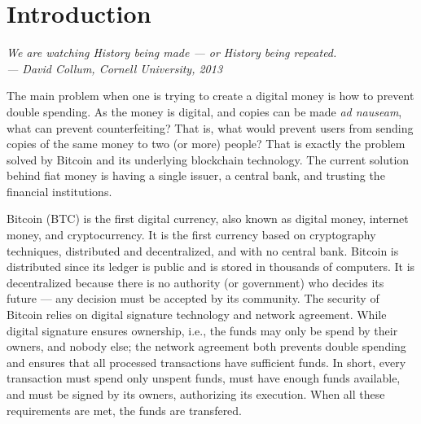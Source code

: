 


\chapter{Introduction}



\bigskip

\begin{flushright}{\slshape
    {We are watching History being made --- or History being repeated.}
	\\ \medskip
    --- David Collum, Cornell University, 2013}
\end{flushright}
\bigskip
\bigskip

The main problem when one is trying to create a digital money is how to prevent double spending. As the money is digital, and copies can be made \textit{ad nauseam}, what can prevent counterfeiting? That is, what would prevent users from sending copies of the same money to two (or more) people? That is exactly the problem solved by Bitcoin and its underlying blockchain technology. The current solution behind fiat money is having a single issuer, a central bank, and trusting the financial institutions.

Bitcoin (BTC) is the first digital currency, also known as digital money, internet money, and cryptocurrency. It is the first currency based on cryptography techniques, distributed and decentralized, and with no central bank. Bitcoin is distributed since its ledger is public and is stored in thousands of computers. It is decentralized because there is no authority (or government) who decides its future --- any decision must be accepted by its community. The security of Bitcoin relies on digital signature technology and network agreement. While digital signature ensures ownership, i.e., the funds may only be spend by their owners, and nobody else; the network agreement both prevents double spending and ensures that all processed transactions have sufficient funds. In short, every transaction must spend only unspent funds, must have enough funds available, and must be signed by its owners, authorizing its execution. When all these requirements are met, the funds are transfered.

